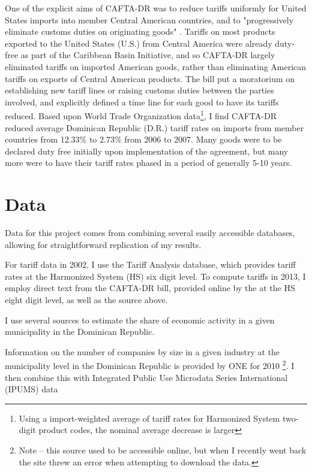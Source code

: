 \documentclass[12pt]{article}
\begin{document}
One of the explicit aims of CAFTA-DR was to reduce tariffs uniformly for United States imports into 
member Central American countries, and to "progressively eliminate customs duties on originating 
goods" \citep{ustraderep}. Tariffs on most products exported to the United States (U.S.) from Central America were 
already duty-free as part of the Caribbean Basin Initiative, and so CAFTA-DR largely eliminated 
tariffs on imported American goods, rather than eliminating American tariffs on exports of Central 
American products. The bill put a moratorium on establishing new tariff lines or raising customs 
duties between the parties involved, and explicitly defined a time line for each good to have its 
tariffs reduced. Based upon World Trade Organization data\footnote{Using a import-weighted average of tariff rates for Harmonized System two-digit product codes, the nominal average decrease is larger}, I find CAFTA-DR reduced average Dominican 
Republic (D.R.) tariff rates on imports from member countries from 12.33\% to 2.73\% from 2006 to 
2007. Many goods were to be declared duty free initially upon implementation of the agreement, but 
many more were to have their tariff rates phased in a period of generally 5-10 years.

\vspace{-10pt}
\section{Data}
\label{sec:Data}
Data for this project comes from combining several easily accessible databases, allowing
for straightforward replication of my results.


For tariff data in 2002, 
I use the \citet{wtotariff} Tariff Analysis database, which provides tariff rates 
at the Harmonized System (HS) six digit level. To compute tariffs in 2013, 
I employ direct text from the CAFTA-DR bill, provided online by the 
\citet{ustraderep} at the HS eight digit level, as well as the source above. 



I use several sources to estimate the share of economic activity in a given municipality
in the Dominican Republic. 

Information on the number of companies by size in a given industry at the 
municipality level in the Dominican Republic is provided by \citet{one} ONE for 2010
\footnote{Note -- this source used to be accessible online, but when I recently went back
the site threw an error when attempting to download the data.}. I then combine
this with Integrated Public Use Microdata Series International
(IPUMS) data 
\end{document}
